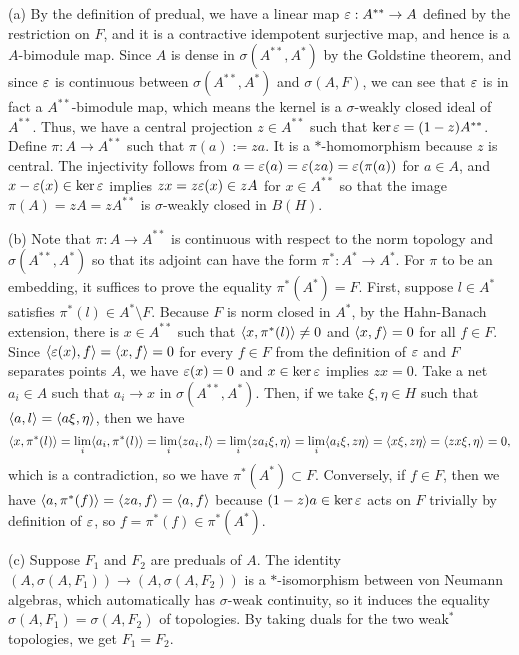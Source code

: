 \documentclass{../../large}
\begin{document}
\begin{pf}
(a)
By the definition of predual, we have a linear map $\varepsilon:A^{**}\to A$ defined by the restriction on $F$, and it is a contractive idempotent surjective map, and hence is a $A$-bimodule map.
Since $A$ is dense in $\sigma(A^{**},A^*)$ by the Goldstine theorem, and since $\varepsilon$ is continuous between $\sigma(A^{**},A^*)$ and $\sigma(A,F)$, we can see that $\varepsilon$ is in fact a $A^{**}$-bimodule map, which means the kernel is a $\sigma$-weakly closed ideal of $A^{**}$.
Thus, we have a central projection $z\in A^{**}$ such that $\ker\varepsilon=(1-z)A^{**}$.
Define $\pi:A\to A^{**}$ such that $\pi(a):=za$.
It is a $*$-homomorphism because $z$ is central.
The injectivity follows from $a=\varepsilon(a)=\varepsilon(za)=\varepsilon(\pi(a))$ for $a\in A$, and $x-\varepsilon(x)\in\ker\varepsilon$ implies $zx=z\varepsilon(x)\in zA$ for $x\in A^{**}$ so that the image $\pi(A)=zA=zA^{**}$ is $\sigma$-weakly closed in $B(H)$.

(b)
Note that $\pi:A\to A^{**}$ is continuous with respect to the norm topology and $\sigma(A^{**},A^*)$ so that its adjoint can have the form $\pi^*:A^*\to A^*$.
For $\pi$ to be an embedding, it suffices to prove the equality $\pi^*(A^*)=F$.
First, suppose $l\in A^*$ satisfies $\pi^*(l)\in A^*\setminus F$.
Because $F$ is norm closed in $A^*$, by the Hahn-Banach extension, there is $x\in A^{**}$ such that $\langle x,\pi^*(l)\rangle\ne0$ and $\langle x,f\rangle=0$ for all $f\in F$.
Since $\langle\varepsilon(x),f\rangle=\langle x,f\rangle=0$ for every $f\in F$ from the definition of $\varepsilon$ and $F$ separates points $A$, we have $\varepsilon(x)=0$ and $x\in\ker\varepsilon$ implies $zx=0$.
Take a net $a_i\in A$ such that $a_i\to x$ in $\sigma(A^{**},A^*)$.
Then, if we take $\xi,\eta\in H$ such that $\langle a,l\rangle=\langle a\xi,\eta\rangle$, then we have
\[\langle x,\pi^*(l)\rangle=\lim_i\langle a_i,\pi^*(l)\rangle=\lim_i\langle za_i,l\rangle=\lim_i\langle za_i\xi,\eta\rangle=\lim_i\langle a_i\xi,z\eta\rangle=\langle x\xi,z\eta\rangle=\langle zx\xi,\eta\rangle=0,\]
which is a contradiction, so we have $\pi^*(A^*)\subset F$.
Conversely, if $f\in F$, then we have $\langle a,\pi^*(f)\rangle=\langle za,f\rangle=\langle a,f\rangle$ because $(1-z)a\in\ker\varepsilon$ acts on $F$ trivially by definition of $\varepsilon$, so $f=\pi^*(f)\in\pi^*(A^*)$.

(c)
Suppose $F_1$ and $F_2$ are preduals of $A$.
The identity $(A,\sigma(A,F_1))\to(A,\sigma(A,F_2))$ is a $*$-isomorphism between von Neumann algebras, which automatically has $\sigma$-weak continuity, so it induces the equality $\sigma(A,F_1)=\sigma(A,F_2)$ of topologies.
By taking duals for the two weak$^*$ topologies, we get $F_1=F_2$.
\end{pf}
\end{document}
